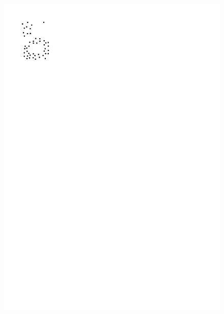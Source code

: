 \begin{marginfigure}
\begin{subfigure}[b]{0.6\linewidth}
    \includegraphics[page=2,width=\textwidth]{figs/clustering.pdf}
    \caption{}
  \end{subfigure}
  \qquad
  \begin{subfigure}[b]{0.6\linewidth}
    \centering

\end{subfigure}
\end{marginfigure}
